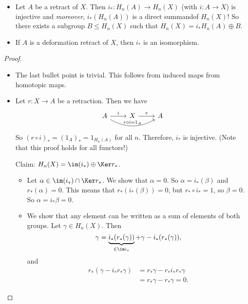\begin{prop}[1.12]
    \begin{itemize}
        \item Let $A$ be a retract of $X$.
            Then $i_*: H_n(A) \to  H_n(X)$ (with $i: A \to  X$) is injective and \emph{moreover}, $i_*(H_n(A))$ is a direct summandof $H_n(X)$!
            So there exists a subgroup $B \le  H_n(X)$ such that $H_n(X) = i_* H_n(A) \oplus B$.
        \item If $A$ is a deformation retract of $X$, then $i_*$ is an isomorphism.
    \end{itemize}
\end{prop}
\begin{proof}
    \begin{itemize}
        \item The last bullet point is trivial.
            This follows from induced maps from homotopic maps.
        \item Let $r: X \to  A$ be a retraction. 
            Then we have
            \[
                \begin{tikzcd}
                    A \arrow[r, "i"] \arrow[rr, bend right, "r  \circ  i = 1_A"]& X \arrow[r, "r"] & A
                \end{tikzcd}
            \]
            So  $(r  \circ  i)_* = (1_A)_* = 1_{H_n(A)}$ for all $n$.
            Therefore, $i_*$ is injective. (Note that this proof holds for all functors!)

            Claim: $H_n(X) = \im(i_*) \oplus \Ker r_*$.
            \begin{itemize}
                \item 
                    Let  $\alpha \in  \im(i_*) \cap  \Ker r_*$.
                    We show that $\alpha = 0$.
                    So  $\alpha = i_* (\beta)$ and  $r_*(\alpha) = 0$.
                    This means that  $r_*(i_*(\beta)) = 0$, but $r_*  \circ i_* = 1$, so $\beta  = 0$.
                    So $\alpha = i_* \beta = 0$.
                \item 
                    We show that any element can be written as a sum of elements of both groups.
                    Let $\gamma \in H_n(X)$.
                    Then
                    \[
                        \gamma = \underbrace{i_* (r _* (\gamma))}_{ \in  \im i_*} + \gamma - i_* (r _* (\gamma))
                    ,\] 
                    and
                    \begin{align*}
                        r_*( \gamma - i_* r_* \gamma) &= r_* \gamma - r_* i_* r_*\gamma\\
                                                      &= r_* \gamma - r_* \gamma = 0
                    .\end{align*}
            \end{itemize}
    \end{itemize}
\end{proof}
